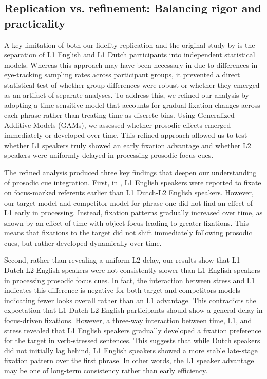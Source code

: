 \subsection{Replication vs. refinement: Balancing rigor and practicality}

A key limitation of both our fidelity replication and the original study by \cite{Ge2021} is the separation of L1 English and L1 Dutch participants into independent statistical models. Whereas this approach may have been necessary in \cite{Ge2021} due to differences in eye-tracking sampling rates across participant groups, it prevented a direct statistical test of whether group differences were robust or whether they emerged as an artifact of separate analyses. To address this, we refined our analysis by adopting a time-sensitive model that accounts for gradual fixation changes across each phrase rather than treating time as discrete bins. Using Generalized Additive Models (GAMs), we assessed whether prosodic effects emerged immediately or developed over time. This refined approach allowed us to test whether L1 speakers truly showed an early fixation advantage and whether L2 speakers were uniformly delayed in processing prosodic focus cues.

The refined analysis produced three key findings that deepen our understanding of prosodic cue integration. First, in \cite{Ge2021}, L1 English speakers were reported to fixate on focus-marked referents earlier than L1 Dutch-L2 English speakers. However, our target model and competitor model for phrase one did not find an effect of L1 early in processing. Instead, fixation patterns gradually increased over time, as shown by an effect of time with object focus leading to greater fixations. This means that fixations to the target did not shift immediately following prosodic cues, but rather developed dynamically over time.

Second, rather than revealing a uniform L2 delay, our results show that L1 Dutch-L2 English speakers were not consistently slower than L1 English speakers in processing prosodic focus cues. In fact, the interaction between stress and L1 indicates this difference is negative for both target and competitors models indicating fewer looks overall rather than an L1 advantage. This contradicts the expectation that L1 Dutch-L2 English participants should show a general delay in focus-driven fixations. However, a three-way interaction between time, L1, and stress revealed that L1 English speakers gradually developed a fixation preference for the target in verb-stressed sentences. This suggests that while Dutch speakers did not initially lag behind, L1 English speakers showed a more stable late-stage fixation pattern over the first phrase. In other words, the L1 speaker advantage may be one of long-term consistency rather than early efficiency.


